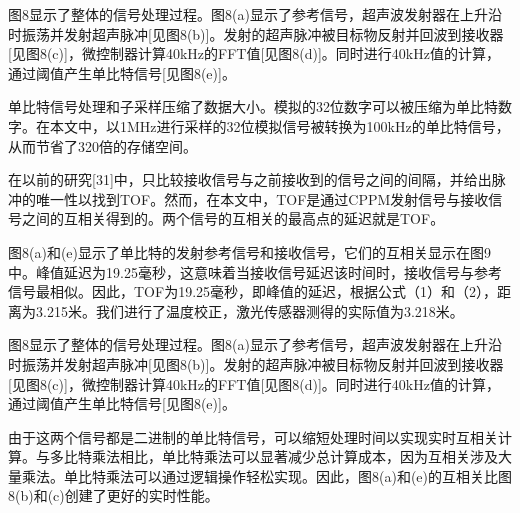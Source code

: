 图8显示了整体的信号处理过程。图8(a)显示了参考信号，超声波发射器在上升沿时振荡并发射超声脉冲[见图8(b)]。发射的超声脉冲被目标物反射并回波到接收器[见图8(c)]，微控制器计算40kHz的FFT值[见图8(d)]。同时进行40kHz值的计算，通过阈值产生单比特信号[见图8(e)]。


单比特信号处理和子采样压缩了数据大小。模拟的32位数字可以被压缩为单比特数字。在本文中，以1MHz进行采样的32位模拟信号被转换为100kHz的单比特信号，从而节省了320倍的存储空间。

在以前的研究[31]中，只比较接收信号与之前接收到的信号之间的间隔，并给出脉冲的唯一性以找到TOF。然而，在本文中，TOF是通过CPPM发射信号与接收信号之间的互相关得到的。两个信号的互相关的最高点的延迟就是TOF。

图8(a)和(e)显示了单比特的发射参考信号和接收信号，它们的互相关显示在图9中。峰值延迟为19.25毫秒，这意味着当接收信号延迟该时间时，接收信号与参考信号最相似。因此，TOF为19.25毫秒，即峰值的延迟，根据公式（1）和（2），距离为3.215米。我们进行了温度校正，激光传感器测得的实际值为3.218米。

图8显示了整体的信号处理过程。图8(a)显示了参考信号，超声波发射器在上升沿时振荡并发射超声脉冲[见图8(b)]。发射的超声脉冲被目标物反射并回波到接收器[见图8(c)]，微控制器计算40kHz的FFT值[见图8(d)]。同时进行40kHz值的计算，通过阈值产生单比特信号[见图8(e)]。

由于这两个信号都是二进制的单比特信号，可以缩短处理时间以实现实时互相关计算。与多比特乘法相比，单比特乘法可以显著减少总计算成本，因为互相关涉及大量乘法。单比特乘法可以通过逻辑操作轻松实现。因此，图8(a)和(e)的互相关比图8(b)和(c)创建了更好的实时性能。